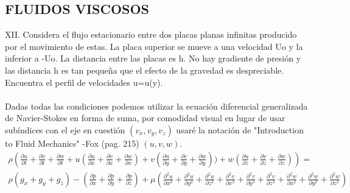 \documentclass{article}
\begin{document}
\subsection*{FLUIDOS VISCOSOS}

XII. Considera el flujo estacionario entre dos placas planas infinitas producido por el movimiento de estas. La placa superior se mueve a una velocidad Uo y la inferior a -Uo. La distancia entre las placas es h. No hay gradiente de presión y las distancia h es tan pequeña que el efecto de la gravedad es despreciable. Encuentra el perfil de velocidades u=u(y).\\\\

Dadas todas las condiciones podemos utilizar la ecuación diferencial generalizada de Navier-Stokes en forma de suma, por comodidad visual en lugar de usar subíndices con el eje en cuestión $(v_x,v_y,v_z)$ usaré la notación de "Introduction to Fluid Mechanics" -Fox (pag. 215) $(u,v,w)$. \\
\begin{align*}
\rho \left( \frac{\partial u}{\partial t} + \frac{\partial v}{\partial t} + \frac{\partial w}{\partial t} + u(\frac{\partial u}{\partial x} + \frac{\partial v}{\partial x} + \frac{\partial w}{\partial x}) + v(\frac{\partial u}{\partial y} + \frac{\partial v}{\partial y} + \frac{\partial w}{\partial y})) + w(\frac{\partial u}{\partial z} + \frac{\partial v}{\partial z} + \frac{\partial w}{\partial z}) \right) = \\
\rho(g_x + g_y + g_z) - (\frac{\partial p}{\partial x} + \frac{\partial p}{\partial y} + \frac{\partial p}{\partial z}) + \mu(\frac{\partial^2 u}{\partial x^2} + \frac{\partial^2 u}{\partial y^2} + \frac{\partial^2 u}{\partial z^2} + \frac{\partial^2 v}{\partial x^2} + \frac{\partial^2 v}{\partial y^2} + \frac{\partial^2 v}{\partial z^2} + \frac{\partial^2 w}{\partial x^2} + \frac{\partial^2 w}{\partial y^2} + \frac{\partial^2 w}{\partial z^2})
\end{align*}
\end{document}
